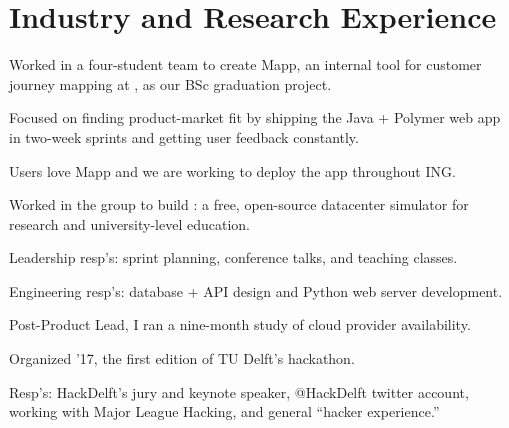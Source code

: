 \documentclass[]{deedy-resume-openfont}
\begin{document}
\begin{minipage}[t]{0.66\textwidth} 


\section{Industry and Research Experience}

\vspace{\topsep}
\begin{tightemize}
    \item Worked in a four-student team to create Mapp, an internal tool for customer journey mapping at \href{https://www.ing.com/}{}, as our BSc graduation project.
    \item Focused on finding product-market fit by shipping the Java + Polymer web app in two-week sprints and getting user feedback constantly.
    \item Users love Mapp and we are working to deploy the app throughout ING.
\end{tightemize}
\vspace{0.5\topsep}

\begin{tightemize}
    \item Worked in the \href{https://atlarge-research.com/}{} group to build \href{https://opendc.ewi.tudelft.nl/}{}: a free, open-source datacenter simulator for research and university-level education.
    \item Leadership resp's: sprint planning, conference talks, and teaching classes.
    \item Engineering resp's: database + API design and Python web server development.
    \item Post-Product Lead, I ran a nine-month study of cloud provider availability.
\end{tightemize}
\vspace{0.5\topsep}

\begin{tightemize}
    \item Organized \href{https://hackdelft.com/}{} '17, the first edition of TU Delft's hackathon.
    \item Resp's: HackDelft’s jury and keynote speaker, @HackDelft twitter account, working with Major League Hacking, and general ``hacker experience.''
\end{tightemize}
\vspace{0.5\topsep}


\end{minipage}
\end{document}
